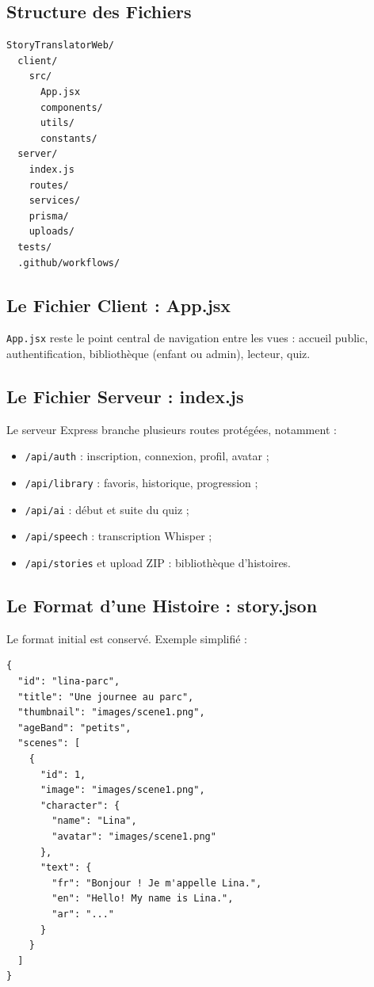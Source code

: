 \documentclass[12pt,twoside,letterpaper]{article}
\begin{document}
\subsection{Structure des Fichiers}

\begin{verbatim}
StoryTranslatorWeb/
  client/
    src/
      App.jsx
      components/
      utils/
      constants/
  server/
    index.js
    routes/
    services/
    prisma/
    uploads/
  tests/
  .github/workflows/
\end{verbatim}

\subsection{Le Fichier Client : App.jsx}

\texttt{App.jsx} reste le point central de navigation entre les vues :
accueil public, authentification, biblioth\`eque (enfant ou admin), lecteur, quiz.

\subsection{Le Fichier Serveur : index.js}

Le serveur Express branche plusieurs routes prot\'eg\'ees, notamment :
\begin{itemize}[leftmargin=*]
  \item \texttt{/api/auth} : inscription, connexion, profil, avatar ;
  \item \texttt{/api/library} : favoris, historique, progression ;
  \item \texttt{/api/ai} : d\'ebut et suite du quiz ;
  \item \texttt{/api/speech} : transcription Whisper ;
  \item \texttt{/api/stories} et upload ZIP : biblioth\`eque d'histoires.
\end{itemize}

\subsection{Le Format d'une Histoire : story.json}

Le format initial est conserv\'e. Exemple simplifi\'e :

\begin{verbatim}
{
  "id": "lina-parc",
  "title": "Une journee au parc",
  "thumbnail": "images/scene1.png",
  "ageBand": "petits",
  "scenes": [
    {
      "id": 1,
      "image": "images/scene1.png",
      "character": {
        "name": "Lina",
        "avatar": "images/scene1.png"
      },
      "text": {
        "fr": "Bonjour ! Je m'appelle Lina.",
        "en": "Hello! My name is Lina.",
        "ar": "..."
      }
    }
  ]
}
\end{verbatim}
\end{document}
